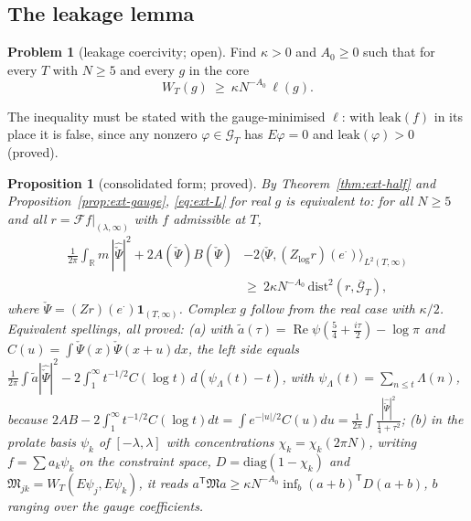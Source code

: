 \documentclass[11pt]{amsart}
\newtheorem{proposition}[theorem]{Proposition}
\theoremstyle{definition}
\newtheorem{problem}[theorem]{Problem}
\theoremstyle{remark}
\newcommand{\R}{\mathbb R}
\newcommand{\Rel}{\operatorname{Re}}
\begin{document}
\subsection{The leakage lemma}\label{subsec:ext-lemma}

\begin{problem}[leakage coercivity; open]\label{prob:ext-L}
Find $\kappa>0$ and $A_0\ge0$ such that for every $T$ with $N\ge5$ and every $g$ in the core
\begin{equation}\label{eq:ext-L}
W_T(g)\ \ge\ \kappa N^{-A_0}\,\ell(g).
\end{equation}
\end{problem}

The inequality must be stated with the gauge-minimised $\ell$: with $\mathrm{leak}(f)$ in its place it is false, since any
nonzero $\varphi\in\mathcal G_T$ has $E\varphi=0$ and $\mathrm{leak}(\varphi)>0$ (proved).

\begin{proposition}[consolidated form; proved]\label{prop:ext-consol}
By Theorem~\ref{thm:ext-half} and Proposition~\ref{prop:ext-gauge}, \eqref{eq:ext-L} for real $g$ is equivalent to: for all
$N\ge5$ and all $r=\mathcal Ff|_{(\lambda,\infty)}$ with $f$ admissible at $T$,
\begin{equation}\label{eq:ext-starstar}
\begin{split}
\frac1{2\pi}\int_\R m\,|\widehat{\check\Psi}|^2+2A(\check\Psi)B(\check\Psi)&-2\big\langle\check\Psi,(Z_{\log}r)(e^\cdot)\big\rangle_{L^2(T,\infty)}\\
&\ge\ 2\kappa N^{-A_0}\,\mathrm{dist}^2(r,\overline{\mathcal G}_T),
\end{split}
\end{equation}
where $\check\Psi=(Zr)(e^\cdot)\mathbf 1_{(T,\infty)}$.
Complex $g$ follow from the real case with $\kappa/2$. Equivalent spellings, all proved: (a) with $\tilde a(\tau)=\Rel\psi(\frac54+
\frac{i\tau}2)-\log\pi$ and $C(u)=\int\check\Psi(x)\check\Psi(x+u)dx$, the left side equals
$\frac1{2\pi}\int\tilde a|\widehat{\check\Psi}|^2-2\int_1^\infty t^{-1/2}C(\log t)\,d(\psi_\Lambda(t)-t)$, with $\psi_\Lambda(t)=\sum_{n\le t}\Lambda(n)$, because $2AB-2\int_1^\infty t^{-1/2}C(\log t)dt=\int e^{-|u|/2}C(u)du=\frac1{2\pi}\int\frac{|\widehat{\check\Psi}|^2}{\frac14+\tau^2}$;
(b) in the prolate basis $\psi_k$ of $[-\lambda,\lambda]$ with concentrations $\chi_k=\chi_k(2\pi N)$, writing $f=\sum a_k\psi_k$ on the
constraint space, $D=\mathrm{diag}(1-\chi_k)$ and $\mathfrak M_{jk}=W_T(E\psi_j,E\psi_k)$, it reads
$a^{\mathsf T}\mathfrak Ma\ge\kappa N^{-A_0}\inf_{b}(a+b)^{\mathsf T}D(a+b)$, $b$ ranging over the gauge coefficients.
\end{proposition}
\end{document}
